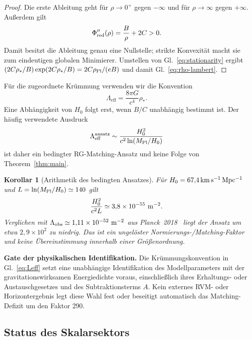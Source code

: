 \documentclass[12pt,a4paper]{article}
\theoremstyle{definition}
\theoremstyle{plain}
\newtheorem{corollary}[definition]{Korollar}
\theoremstyle{remark}
\newcommand{\Leff}{\Lambda_{\mathrm{eff}}}
\begin{document}
\begin{proof}
Die erste Ableitung geht für \(\rho\to0^+\) gegen \(-\infty\) und für
\(\rho\to\infty\) gegen \(+\infty\). Außerdem gilt
\begin{equation}
 \Phi_{\rm red}''(\rho)=\frac{B}{\rho}+2C>0 .
\end{equation}
Damit besitzt die Ableitung genau eine Nullstelle; strikte Konvexität macht
sie zum eindeutigen globalen Minimierer. Umstellen von
Gl.~\eqref{eq:stationarity} ergibt
\((2C\rho_\ast/B)\exp(2C\rho_\ast/B)=2C\rho_{\rm Pl}/(eB)\) und damit
Gl.~\eqref{eq:rho-lambert}.
\end{proof}

Für die zugeordnete Krümmung verwenden wir die Konvention
\begin{equation}\label{eq:Leff}
 \Leff=\frac{8\pi G}{c^4}\rho_\ast .
\end{equation}
Eine Abhängigkeit von \(H_0\) folgt erst, wenn \(B/C\) unabhängig bestimmt
ist. Der häufig verwendete Ausdruck
\begin{equation}\label{eq:bound}
 \Leff^{\rm ansatz}
 \sim\frac{H_0^2}{c^2\ln(M_{\rm Pl}/H_0)}
\end{equation}
ist daher ein bedingter RG-Matching-Ansatz und keine Folge von
Theorem~\ref{thm:main}.

\begin{corollary}[Arithmetik des bedingten Ansatzes]\label{cor:numerical}
Für \(H_0=67{,}4\,{\rm km\,s^{-1}\,Mpc^{-1}}\) und
\(L=\ln(M_{\rm Pl}/H_0)\simeq140\) gilt
\begin{equation}
 \frac{H_0^2}{c^2L}\simeq3{,}8\times10^{-55}\ {\rm m}^{-2}.
\end{equation}
Verglichen mit
\(\Lambda_{\rm obs}\simeq1{,}11\times10^{-52}\ {\rm m}^{-2}\)
aus Planck~2018~\cite{Planck2018} liegt der Ansatz um etwa
\(2{,}9\times10^2\) zu niedrig. Das ist ein ungelöster
Normierungs-/Matching-Faktor und keine Übereinstimmung innerhalb einer
Größenordnung.
\end{corollary}

\noindent\textbf{Gate der physikalischen Identifikation.}
Die Krümmungskonvention in Gl.~\eqref{eq:Leff} setzt eine unabhängige
Identifikation des Modellparameters mit der gravitationswirksamen
Energiedichte voraus, einschließlich ihres Erhaltungs- oder
Austauschgesetzes und des Subtraktionsterms $A$. Kein externes RVM-
oder Horizontergebnis legt diese Wahl fest oder beseitigt automatisch
das Matching-Defizit um den Faktor $290$.

\subsection{Status des Skalarsektors}\label{sec:scalar-tensor}
\end{document}
